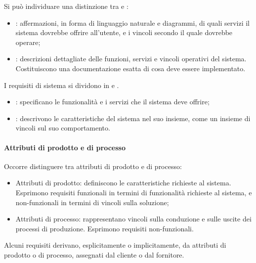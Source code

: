 Si può individuare una distinzione tra  e
:

\begin{itemize}
  \item {}: affermazioni, in forma di linguaggio naturale
    e diagrammi, di quali servizi il sistema dovrebbe offrire all'utente, e i
    vincoli secondo il quale dovrebbe operare;
  \item {}: descrizioni dettagliate delle funzioni,
    servizi e vincoli operativi del sistema. Costituiscono una documentazione
    esatta di cosa deve essere implementato.
\end{itemize}

I requisiti di sistema si dividono in  e
.

\begin{itemize}
    \item {}: specificano le funzionalità e i servizi
      che il sistema deve offrire;
    \item {}: descrivono le caratteristiche del
      sistema nel suo insieme, come un insieme di vincoli sul suo comportamento.
  \end{itemize}

\paragraph{Attributi di prodotto e di processo} %
\label{par:attributi_di_prodotto_e_di_processo}

Occorre distinguere tra attributi di prodotto e di processo:

\begin{itemize}
  \item Attributi di prodotto: definiscono le caratteristiche richieste al
  sistema. Esprimono requisiti funzionali in termini di funzionalità richieste
  al sistema, e non-funzionali in termini di vincoli sulla soluzione;
  \item Attributi di processo: rappresentano vincoli sulla conduzione e sulle
  uscite dei processi di produzione. Esprimono requisiti non-funzionali.
\end{itemize}

Alcuni requisiti derivano, esplicitamente o implicitamente, da attributi di
prodotto o di processo, assegnati dal cliente o dal fornitore.

